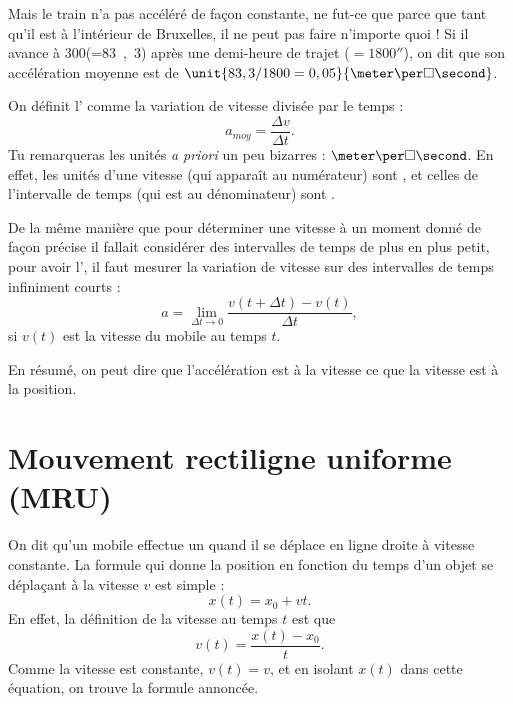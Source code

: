 Mais le train n'a pas accéléré de façon constante, ne fut-ce que parce que tant qu'il est à l'intérieur de Bruxelles, il ne peut pas faire n'importe quoi ! Si il avance à \unit{300}{\kilo\meter\per\hour}(=\unit{83,3}{\meter\per\second}) après une demi-heure de trajet ($=\unit{1800}{\second}$), on dit que son accélération moyenne est de $\unit{83,3/1800=0,05}{\meter\per\square\second}$.

On définit l' comme la variation de vitesse divisée par le temps :
\[ 
  a_{moy}=\frac{ \Delta v }{ \Delta t }.
\]
Tu remarqueras les unités \emph{a priori} un peu bizarres : $\meter\per\square\second$. En effet, les unités d'une vitesse (qui apparaît au numérateur) sont \meter\per\second, et celles de l'intervalle de temps (qui est au dénominateur) sont \second.

De la même manière que pour déterminer une vitesse à un moment donné de façon précise il fallait considérer des intervalles de temps de plus en plus petit, pour avoir l', il faut mesurer la variation de vitesse sur des intervalles de temps infiniment courts :
\begin{equation}		\label{EqDefAcclvlim}
	a=\lim_{\Delta t\to 0}\frac{ v(t+\Delta t)-v(t) }{ \Delta t },
\end{equation}
si $v(t)$ est la vitesse du mobile au temps $t$.


En résumé, on peut dire que l'accélération est à la vitesse ce que la vitesse est à la position.

\section{Mouvement rectiligne uniforme (MRU)}

On dit qu'un mobile effectue un  quand il se déplace en ligne droite à vitesse constante. La formule qui donne la position en fonction du temps d'un objet se déplaçant à la vitesse $v$ est simple :
\begin{equation}
  x(t)=x_0+vt.
\end{equation}
En effet, la définition de la vitesse au temps $t$ est que 
\[ 
  v(t)=\frac{ x(t)-x_0 }{ t }.
\]
Comme la vitesse est constante, $v(t)=v$, et en isolant $x(t)$ dans cette équation, on trouve la formule annoncée.



